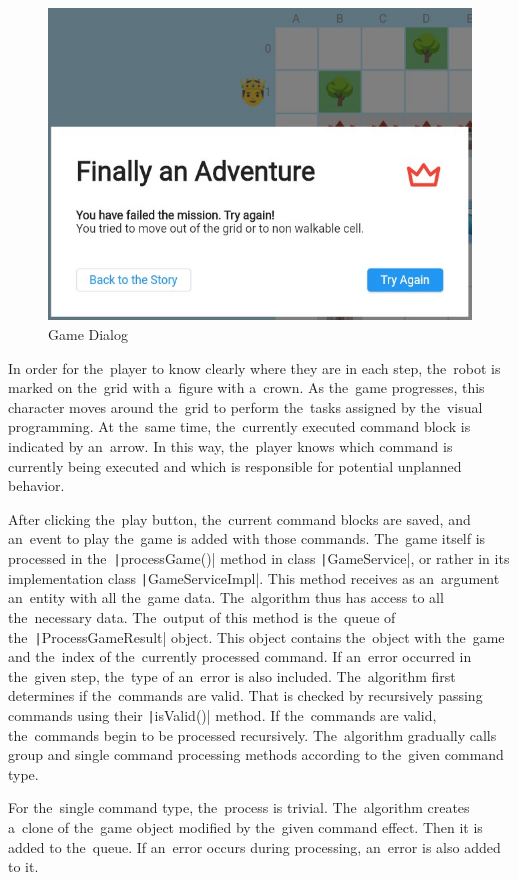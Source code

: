 \begin{figure}
    \centering
    \includegraphics[width=0.7\linewidth]{assets/implementation/gamedialog.jpeg}
    \caption{Game Dialog}
    \label{fig:gamedialog}
\end{figure}

In order for the~player to know clearly where they are in each step, the~robot is marked on the~grid with a~figure with a~crown.
As the~game progresses, this character moves around the~grid to perform the~tasks assigned by the~visual programming.
At the~same time, the~currently executed command block is indicated by an~arrow.
In this way, the~player knows which command is currently being executed and which is responsible for potential unplanned behavior.

After clicking the~play button, the~current command blocks are saved, and an~event to play the~game is added with those commands.
The~game itself is processed in the~\texttt|processGame()| method in class \texttt|GameService|, or rather in its implementation class \texttt|GameServiceImpl|.
This method receives as an~argument an~entity with all the~game data.
The~algorithm thus has access to all the~necessary data.
The~output of this method is the~queue of the~\texttt|ProcessGameResult| object.
This object contains the~object with the~game and the~index of the~currently processed command.
If an~error occurred in the~given step, the~type of an~error is also included. 
The~algorithm first determines if the~commands are valid.
That is checked by recursively passing commands using their \texttt|isValid()| method.
If the~commands are valid, the~commands begin to be processed recursively.
The~algorithm gradually calls group and single command processing methods according to the~given command type.

For the~single command type, the~process is trivial.
The~algorithm creates a~clone of the~game object modified by the~given command effect.
Then it is added to the~queue.
If an~error occurs during processing, an~error is also added to it.

